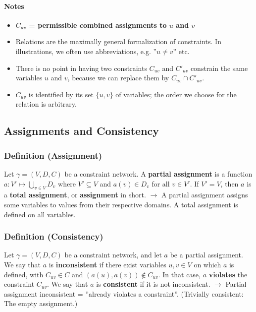 \documentclass[conference, a4paper]{styles/acmsiggraph}
\newcommand\subsubsubsection{\paragraph}
\begin{document}
            \subsubsubsection{Notes}
                \begin{itemize}
                    \item \textbf{$C_{uv}$ = permissible combined assignments to $u$ and $v$}
                    \item Relations are the maximally general formalization of constraints. In illustrations, we often use abbreviations, e.g. ''$u \neq v$'' etc.
                    \item There is no point in having two constraints $C_{uv}$ and $C'_{uv}$ constrain the same variables $u$ and $v$, because we can replace them by $C_{uv} \cap C'_{uv}$.
                    \item $C_{uv}$ is identified by its set $\{u,v\}$ of variables; the order we choose for the relation is arbitrary.
                \end{itemize}
    
    
    
    
    
    
    \subsection{Assignments and Consistency}
        \subsubsection{Definition (Assignment)}
            Let $\gamma = (V,D,C)$ be a constraint network.\newline
            A \textbf{partial assignment} is a function $a : V' \mapsto \bigcup\limits_{v \in V} D_v$ where $V' \subseteq V$ and $a(v) \in D_v$ for all $v \in V'$.\newline
            If $V' = V$, then $a$ is a \textbf{total assignment}, or \textbf{assignment} in short.\newline
            $\rightarrow$ A partial assignment assigns some variables to values from their respective domains.
            A total assignment is defined on all variables.
        
        \subsubsection{Definition (Consistency)}
            Let $\gamma = (V,D,C)$ be a constraint network, and let $a$ be a partial assignment.
            We say that $a$ is \textbf{inconsistent} if there exist variables $u,v \in V$ on which $a$ is defined, with $C_{uv} \in C$ and $(a(u),a(v)) \notin C_{uv}$.
            In that case, $a$ \textbf{violates} the constraint $C_{uv}$.
            We say that $a$ is \textbf{consistent} if it is not inconsistent.\newline
            $\rightarrow$ Partial assignment inconsistent = ''already violates a constraint''. (Trivially consistent: The empty assignment.)
        
\end{document}
